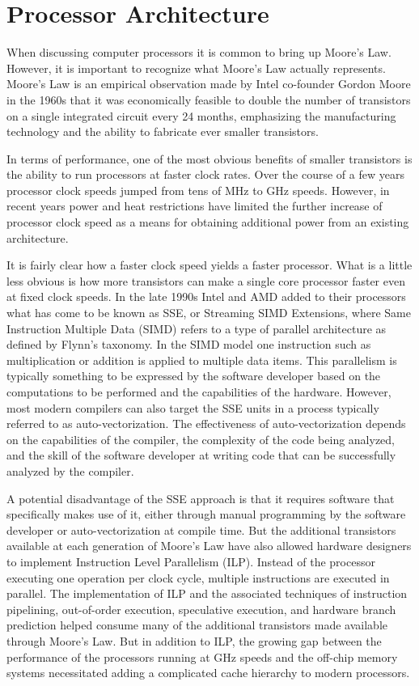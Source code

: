 \documentclass{JINST}
\begin{document}
\section{Processor Architecture}

When discussing computer processors it is common to bring up Moore's Law.  However, it is important to recognize what Moore's Law actually represents.  Moore's Law is an empirical observation made by Intel co-founder Gordon Moore in the 1960s that it was economically feasible to double the number of transistors on a single integrated circuit every 24 months,
emphasizing the manufacturing technology and the ability to fabricate ever smaller transistors.


In terms of performance, one of the most obvious benefits of smaller transistors is the ability to run processors at faster clock rates.  Over the course of a few years processor clock speeds jumped from tens of MHz to GHz speeds.  However, in recent years power and heat restrictions have limited the further increase of processor clock speed as a means for obtaining additional power from an existing architecture.

It is fairly clear how a faster clock speed yields a faster processor.  What is a little less obvious is how more transistors can make a single core processor faster even at fixed clock speeds.  In the late 1990s Intel and AMD added to their processors what has come to be known as SSE, or Streaming SIMD Extensions, where Same Instruction Multiple Data (SIMD)
refers to a type of parallel architecture as defined by Flynn's taxonomy.  In the SIMD  model one instruction such as multiplication or addition is applied to multiple data items.  This parallelism is typically something to be expressed by the software developer based on the computations to be performed and the capabilities of the hardware.  However, most modern compilers can also target the SSE units in a process typically referred to as auto-vectorization.  The effectiveness of auto-vectorization depends on the capabilities of the compiler, the complexity of the code being analyzed, and the skill of the software developer at writing code that can be successfully analyzed by the compiler.

A potential disadvantage of the SSE approach is that it requires software that specifically makes use of it, either through manual programming by the software developer or auto-vectorization at compile time.  But the additional transistors available at each generation of Moore's Law have also allowed hardware designers to implement Instruction Level Parallelism (ILP).  Instead of the processor executing one operation per clock cycle, multiple instructions are executed in parallel. The implementation of ILP and the associated techniques of instruction pipelining, out-of-order execution, speculative execution, and hardware branch prediction helped consume many of the additional transistors made available through Moore's Law.  But in addition to ILP, the growing gap between the performance of the processors running at GHz speeds and the off-chip memory systems necessitated adding a complicated cache hierarchy to modern processors.
\end{document}
